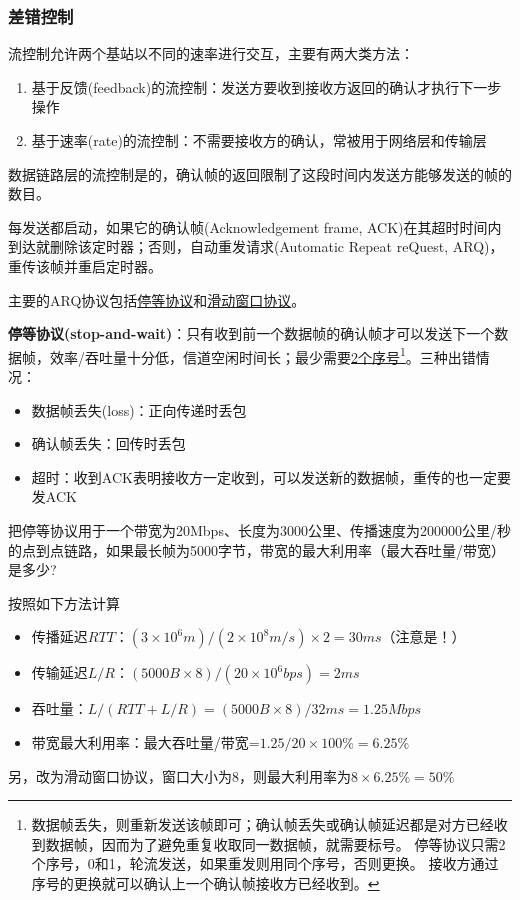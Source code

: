 \subsubsection{差错控制}
流控制允许两个基站以不同的速率进行交互，主要有两大类方法：
\begin{enumerate}
	\item 基于反馈(feedback)的流控制：发送方要收到接收方返回的确认才执行下一步操作
	\item 基于速率(rate)的流控制：不需要接收方的确认，常被用于网络层和传输层
\end{enumerate}
数据链路层的流控制是的，确认帧的返回限制了这段时间内发送方能够发送的帧的数目。

每发送都启动，如果它的确认帧(Acknowledgement frame, ACK)在其超时时间内到达就删除该定时器；否则，自动重发请求(Automatic Repeat reQuest, ARQ)，重传该帧并重启定时器。

主要的ARQ协议包括\underline{停等协议}和\underline{滑动窗口协议}。

\myhline
\textbf{停等协议(stop-and-wait)}：只有收到前一个数据帧的确认帧才可以发送下一个数据帧，效率/吞吐量十分低，信道空闲时间长；最少需要\underline{2个序号}\footnote{数据帧丢失，则重新发送该帧即可；确认帧丢失或确认帧延迟都是对方已经收到数据帧，因而为了避免重复收取同一数据帧，就需要标号。
停等协议只需2个序号，0和1，轮流发送，如果重发则用同个序号，否则更换。
接收方通过序号的更换就可以确认上一个确认帧接收方已经收到。}。三种出错情况：
\begin{itemize}
	\item 数据帧丢失(loss)：正向传递时丢包
	\item 确认帧丢失：回传时丢包
	\item 超时：收到ACK表明接收方一定收到，可以发送新的数据帧，重传的也一定要发ACK
\end{itemize}

\begin{example}
	把停等协议用于一个带宽为20Mbps、长度为3000公里、传播速度为200000公里/秒的点到点链路，如果最长帧为5000字节，带宽的最大利用率（最大吞吐量/带宽）是多少?
\end{example}
\begin{analysis}
	按照如下方法计算
	\begin{itemize}
		\item 传播延迟$RTT$：$(3\times 10^6 m) / (2\times 10^8 m/s)\times 2=30ms$（注意是！）
		\item 传输延迟$L/R$：$(5000B\times 8)/(20\times 10^6bps)=2ms$
		\item 吞吐量：$L/(RTT+L/R)=(5000B\times 8)/32ms=1.25Mbps$
		\item 带宽最大利用率：最大吞吐量/带宽=$1.25/20\times 100\%=6.25\%$
	\end{itemize}
	另，改为滑动窗口协议，窗口大小为8，则最大利用率为$8\times 6.25\%=50\%$
\end{analysis}

